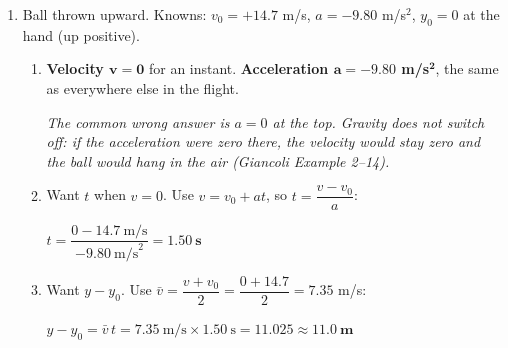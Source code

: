 \documentclass[12pt, twoside]{article}
\begin{document}
\begin{enumerate}[itemsep=0.5cm]
\begin{enumerate}[itemsep=0.3cm]
      $t = \sqrt{11.4~\text{s}^2} = 3.3763\ldots \approx \mathbf{3.38~\textbf{s}}$

      \emph{A common slip is to forget the $\frac{1}{2}$, giving $t^2 = 5.7$ and
      $t \approx 2.39$ s, or to stop at $t^2 = 11.4$.}
    \item Want $v$. Use $v = v_0 + at$, carrying the unrounded time:

      $v = 0 + (9.80~\text{m/s}^2)(3.3763\ldots~\text{s}) = 33.088\ldots
      \approx \mathbf{33.1~\textbf{m/s}}$ downward

      \emph{Also accept $v^2 = v_0^2 + 2a(y - y_0) = 2(9.80)(55.86) = 1094.856$, so
      $v \approx 33.1$ m/s; this route does not need part (a). About 119 km/h.}
    \item \textbf{They land at the same time.} Without air resistance, every object
      falls with the same acceleration $g$, whatever its mass.

      \emph{Before Galileo, it was believed that a heavier object falls faster. For
      two dense balls the air makes almost no difference; it matters for a sheet
      of paper or a feather (Giancoli Figs.\ 2--20 and 2--21).}
  \end{enumerate}

\newpage

\item Ball thrown upward. Knowns: $v_0 = +14.7$ m/s, $a = -9.80$ m/s$^2$, $y_0 = 0$
  at the hand (up positive).
  \begin{enumerate}[itemsep=0.3cm]
    \item \textbf{Velocity $\mathbf{v = 0}$} for an instant. \textbf{Acceleration
      $\mathbf{a = -9.80}$ m/s$^\mathbf{2}$}, the same as everywhere else in the
      flight.

      \emph{The common wrong answer is $a = 0$ at the top. Gravity does not switch
      off: if the acceleration were zero there, the velocity would stay zero and the
      ball would hang in the air (Giancoli Example 2--14).}
    \item Want $t$ when $v = 0$. Use $v = v_0 + at$, so $t = \dfrac{v - v_0}{a}$:

      $t = \dfrac{0 - 14.7~\text{m/s}}{-9.80~\text{m/s}^2} = \mathbf{1.50~\textbf{s}}$
    \item Want $y - y_0$. Use $\bar{v} = \dfrac{v + v_0}{2} = \dfrac{0 + 14.7}{2}
      = 7.35$ m/s:

      $y - y_0 = \bar{v}\,t = 7.35~\text{m/s} \times 1.50~\text{s} = 11.025
      \approx \mathbf{11.0~\textbf{m}}$


\end{enumerate}
\end{enumerate}
\end{document}
